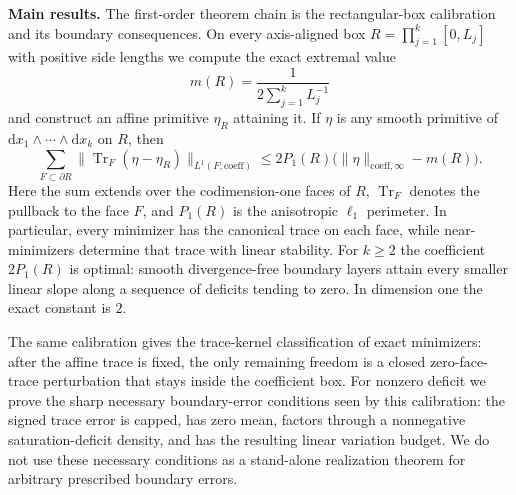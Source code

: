 \documentclass[11pt,letterpaper]{article}
\numberwithin{equation}{section}
\theoremstyle{plain}
\theoremstyle{definition}
\theoremstyle{remark}
\newcommand{\dd}{\mathrm{d}}
\newcommand{\norm}[1]{\lVert #1 \rVert}
\newcommand{\coeff}{\mathrm{coeff}}
\DeclareMathOperator{\Tr}{Tr}
\begin{document}
\medskip
\noindent\textbf{Main results.}
The first-order theorem chain is the rectangular-box calibration and its
boundary consequences.  On every axis-aligned box
$R=\prod_{j=1}^k[0,L_j]$ with positive side lengths we compute the exact
extremal value
\[
m(R)=\frac{1}{2\sum_{j=1}^k L_j^{-1}}
\]
and construct an affine primitive $\eta_R$ attaining it. If $\eta$ is any
smooth primitive of $\dd x_1\wedge\cdots\wedge\dd x_k$ on $R$, then
\[
\sum_{F\subset\partial R}
\norm{\Tr_F(\eta-\eta_R)}_{L^1(F;\coeff)}
\le
2P_1(R)\bigl(\norm{\eta}_{\coeff,\infty}-m(R)\bigr).
\]
Here the sum extends over the codimension-one faces of $R$, $\Tr_F$ denotes
the pullback to the face $F$, and $P_1(R)$ is the anisotropic $\ell_1$
perimeter. In particular, every minimizer has the canonical trace on each face,
while near-minimizers determine that trace with linear stability. For $k\ge2$
the coefficient $2P_1(R)$ is optimal: smooth divergence-free boundary layers
attain every smaller linear slope along a sequence of deficits tending to zero.
In dimension one the exact constant is $2$.

The same calibration gives the trace-kernel classification of exact
minimizers: after the affine trace is fixed, the only remaining freedom is a
closed zero-face-trace perturbation that stays inside the coefficient box.  For
nonzero deficit we prove the sharp necessary boundary-error conditions seen by
this calibration: the signed trace error is capped, has zero mean, factors
through a nonnegative saturation-deficit density, and has the resulting linear
variation budget.  We do not use these necessary conditions as a stand-alone
realization theorem for arbitrary prescribed boundary errors.
\end{document}
